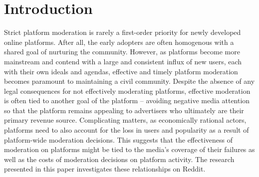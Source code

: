 \section{Introduction}
\label{sec:introduction}

Strict platform moderation is rarely a first-order priority for newly developed
online platforms. After all, the early adopters are often homogenous with
a shared goal of nurturing the community. However, as platforms become more
mainstream and contend with a large and consistent influx of new users, each
with their own ideals and agendas, effective and timely platform moderation
becomes paramount to maintaining a civil community. Despite the absence of any
legal consequences for not effectively moderating platforms, effective
moderation is often tied to another goal of the platform -- avoiding negative
media attention so that the platform remains appealing to advertisers who
ultimately are their primary revenue source. Complicating matters, as
economically rational actors, platforms need to also account for the loss in
users and popularity as a result of platform-wide moderation decisions. This
suggests that the effectiveness of moderation on platforms might be tied to the
media's coverage of their failures as well as the costs of moderation decisions
on platform activity. The research presented in this paper investigates these
relationships on Reddit. 

